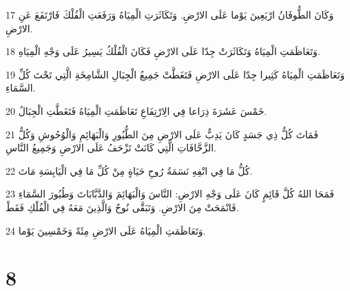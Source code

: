 \par 17 وَكَانَ الطُّوفَانُ ارْبَعِينَ يَوْما عَلَى الارْضِ. وَتَكَاثَرَتِ الْمِيَاهُ وَرَفَعَتِ الْفُلْكَ فَارْتَفَعَ عَنِ الارْضِ.
\par 18 وَتَعَاظَمَتِ الْمِيَاهُ وَتَكَاثَرَتْ جِدّا عَلَى الارْضِ فَكَانَ الْفُلْكُ يَسِيرُ عَلَى وَجْهِ الْمِيَاهِ.
\par 19 وَتَعَاظَمَتِ الْمِيَاهُ كَثِيرا جِدّا عَلَى الارْضِ فَتَغَطَّتْ جَمِيعُ الْجِبَالِ الشَّامِخَةِ الَّتِي تَحْتَ كُلِّ السَّمَاءِ.
\par 20 خَمْسَ عَشَرَةَ ذِرَاعا فِي الِارْتِفَاعِ تَعَاظَمَتِ الْمِيَاهُ فَتَغَطَّتِ الْجِبَالُ.
\par 21 فَمَاتَ كُلُّ ذِي جَسَدٍ كَانَ يَدِبُّ عَلَى الارْضِ مِنَ الطُّيُورِ وَالْبَهَائِمِ وَالْوُحُوشِ وَكُلُّ الزَّحَّافَاتِ الَّتِي كَانَتْ تَزْحَفُ عَلَى الارْضِ وَجَمِيعُ النَّاسِ.
\par 22 كُلُّ مَا فِي انْفِهِ نَسَمَةُ رُوحِ حَيَاةٍ مِنْ كُلِّ مَا فِي الْيَابِسَةِ مَاتَ.
\par 23 فَمَحَا اللهُ كُلَّ قَائِمٍ كَانَ عَلَى وَجْهِ الارْضِ: النَّاسَ وَالْبَهَائِمَ وَالدَّبَّابَاتَ وَطُيُورَ السَّمَاءِ فَانْمَحَتْ مِنَ الارْضِ. وَتَبَقَّى نُوحٌ وَالَّذِينَ مَعَهُ فِي الْفُلْكِ فَقَطْ.
\par 24 وَتَعَاظَمَتِ الْمِيَاهُ عَلَى الارْضِ مِئَةً وَخَمْسِينَ يَوْما.

\chapter{8}

